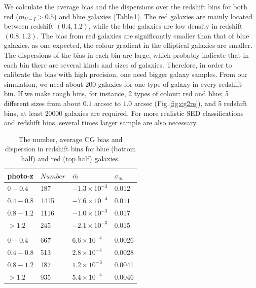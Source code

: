 \documentclass[useAMS,usenatbib]{mnras}
\newcommand{\be}{\begin{equation}}
\newcommand{\ee}{\end{equation}}
\begin{document}
We calculate the average bias and the dispersions over the redshift
bins for both red ($m_{V-I}>0.5$) and blue galaxies
(Table\,\ref{table:calibration}). The red galaxies are mainly located
between redshift $(0.4,1.2)$, while the blue galaxies are low density
in redshift $(0.8,1.2)$. The bias from red galaxies are significantly
smaller than that of blue galaxies, as one expected, the colour
gradient in the elliptical galaxies are smaller. The dispersions of
the bias in each bin are large, which probably indicate that in each
bin there are several kinds and sizes of galaxies. Therefore, in
order to calibrate the bias with high precision, one need bigger
galaxy samples. From our simulation, we need about $200$ galaxies for
one type of galaxy in every redshift bin. If we make rough bins, for
instance, 2 types of colour: red and blue; 5 different sizes from
about $0.1$ arcsec to $1.0$ arcsec (Fig.\ref{fig:cg2re}), and 5
redshift bins, at least $20 000$ galaxies are required.  For more
realistic SED classifications and redshift bins, several times larger
sample are also necessary.


\begin{center}
\begin{table}
  \begin{tabular}{llll}
    \hline
    photo-z    &$Number$  &$\bar{m}$  &$\sigma_m$ \\
    \hline
    $0-0.4$   &187  &$-1.3\times10^{-3}$  &$0.012$\\
    $0.4-0.8$  &1415 &$-7.6\times10^{-4}$  &$0.011$\\
    $0.8-1.2$  &1116 &$-1.0\times10^{-3}$  &0.017\\
    $>1.2$  &245  &$-2.1\times10^{-3}$  &0.015\\
    \\
    $0-0.4$  &667  &$6.6\times10^{-4}$  &0.0026\\
    $0.4-0.8$ &513  &$2.8\times10^{-4}$  &0.0028\\
    $0.8-1.2$ &187  &$1.2\times10^{-3}$  &0.0041\\
    $>1.2$  &935  &$5.4\times10^{-4}$  &0.0046\\
    \hline
  \end{tabular}
  \caption{\label{table:calibration}The number, average CG bias and dispersion
  in redshift bins for blue (bottom half) and red (top half) galaxies. }
\end{table}
\end{center}

\end{document}
